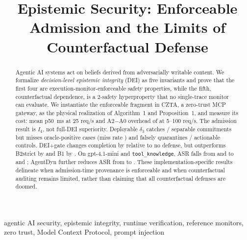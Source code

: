 \documentclass[conference,compsoc]{IEEEtran}
\theoremstyle{definition}
\theoremstyle{plain}
\newcommand{\Ifour}{\ensuremath{I_4}}
\begin{document}

\title{Epistemic Security: Enforceable Admission and the Limits of Counterfactual Defense}

\author{
}

\maketitle

\begin{abstract}
Agentic AI systems act on beliefs derived from adversarially writable
content. We formalize \emph{decision-level epistemic integrity} (DEI)
as five invariants and prove that the first four are
execution-monitor-enforceable safety properties, while the fifth,
counterfactual dependence, is a 2-safety hyperproperty that no
single-trace monitor can evaluate. We instantiate the enforceable
fragment in CZTA, a zero-trust MCP gateway, as the physical realization
of Algorithm~1 and Proposition~1, and measure its cost: mean p50
\RqFiveATwoTwentyFiveMedian\,ms at 25 req/s and A2$-$A0 overhead of
\RqFiveOverheadRange{} at 5--100 req/s. The admission result is
\Ifour, not full-DEI superiority. Deployable $\delta_3$ catches
\RqTwoSeparableDeltaThreeK/\RqTwoSeparableDeltaThreeN{} separable
commitments but misses \RqTwoDeltaThreeFn{} oracle-positive cases
(miss rate \RqTwoDeltaThreeMissRate) and falsely quarantines
\RqTwoHonestDeltaThreeK/\RqTwoHonestDeltaThreeN{} actionable controls.
DEI+gate changes completion by \RqThreeUtilDeiGatePairedRD{} relative
to no defense, but outperforms B2strict by
\RqThreeUtilDeiGateVsBTwoStrictPairedRD{} and B1 by
\RqThreeUtilDeiGateVsBOnePairedRD. On gpt-4.1-mini and
\texttt{tool\_knowledge}, ASR falls from
\RqFourASecNoDefenseASR{} and \RqFourCSecNoDefenseASR{} to
\RqFourASecDeiASR{} and \RqFourCSecDeiASR; AgentDyn further reduces ASR
from \RqAgentDynSecNoDefenseASR{} to \RqAgentDynSecDeiASR. These
implementation-specific results delineate when admission-time
provenance is enforceable and when counterfactual auditing remains
limited, rather than claiming that all counterfactual defenses are
doomed.
\end{abstract}

\begin{IEEEkeywords}
agentic AI security, epistemic integrity, runtime verification,
reference monitors, zero trust, Model Context Protocol, prompt
injection
\end{IEEEkeywords}
\end{document}
